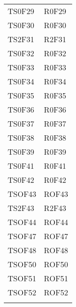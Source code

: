 \documentclass[../PianoDiQualifica.tex]{subfiles}
\begin{document}
\begin{longtable}[c] { >{\centering\arraybackslash}p{3cm} >{\centering\arraybackslash}p{3cm}}
			\addlinespace[0.3em]
			\midrule
			\addlinespace[0.3em]	
			TS0F29 & R0F29 \\ 
			\addlinespace[0.3em]
			\midrule
			\addlinespace[0.3em]
			TS0F30 & R0F30 \\ 
			\addlinespace[0.3em]
			\midrule
			\addlinespace[0.3em]
			TS2F31 & R2F31 \\ 
			\addlinespace[0.3em]
			\midrule
			\addlinespace[0.3em]
			TS0F32 & R0F32 \\
			\addlinespace[0.3em]
			\midrule
			\addlinespace[0.3em]
			TS0F33 & R0F33 \\ 
			\addlinespace[0.3em]
			\midrule
			\addlinespace[0.3em]
			TS0F34 & R0F34 \\ 
			\addlinespace[0.3em]
			\midrule
			\addlinespace[0.3em]
			TS0F35 & R0F35 \\ 
			\addlinespace[0.3em]
			\midrule
			\addlinespace[0.3em]
			TS0F36 & R0F36 \\
			\addlinespace[0.3em]
			\midrule
			\addlinespace[0.3em]
			TS0F37 & R0F37 \\ 
			\addlinespace[0.3em]
			\midrule
			\addlinespace[0.3em]
			TS0F38 & R0F38 \\ 
			\addlinespace[0.3em]
			\midrule
			\addlinespace[0.3em]
			TS0F39 & R0F39 \\ 
			\addlinespace[0.3em]
			\midrule
			\addlinespace[0.3em]
			TS0F41 & R0F41 \\
			\addlinespace[0.3em]
			\midrule
			\addlinespace[0.3em]
			TS0F42 & R0F42 \\ 
			\addlinespace[0.3em]
			\midrule
			\addlinespace[0.3em]
			TSOF43 & ROF43 \\ 
			\addlinespace[0.3em]
			\midrule
			\addlinespace[0.3em]
			TS2F43 & R2F43 \\ 
			\addlinespace[0.3em]
			\midrule
			\addlinespace[0.3em]
			TSOF44 & ROF44 \\ 
			\addlinespace[0.3em]
			\midrule
			\addlinespace[0.3em]
			TSOF47 & ROF47 \\ 
			\addlinespace[0.3em]
			\midrule
			\addlinespace[0.3em]
			TSOF48 & ROF48 \\ 
			\addlinespace[0.3em]
			\midrule
			\addlinespace[0.3em]
			TSOF50 & ROF50 \\ 
			\addlinespace[0.3em]
			\midrule
			\addlinespace[0.3em]
			TSOF51 & ROF51 \\
			\addlinespace[0.3em]
			\midrule
			\addlinespace[0.3em]
			TSOF52 & ROF52 \\ 
			\addlinespace[0.3em]
			\midrule
			\addlinespace[0.3em]

\end{longtable}
\end{document}
